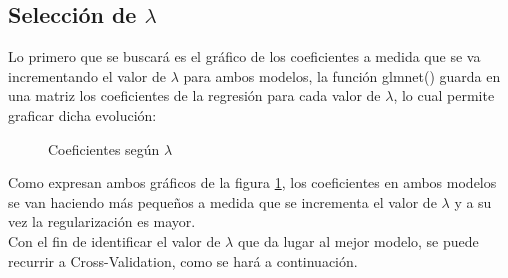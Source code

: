 \subsection{Selección de $\lambda$}


Lo primero que se buscará es el gráfico de los coeficientes a medida que se va incrementando el valor de $\lambda$ para ambos modelos, la función glmnet()\cite{glmnet} guarda en una matriz los coeficientes de la regresión para cada valor de $\lambda$, lo cual permite graficar dicha evolución:



\begin{figure}[h]
\centering
{}%
\hspace{0.25cm}%
\caption{Coeficientes según $\lambda$}
\label{coeficientes}
\end{figure}


Como expresan ambos gráficos de la figura \ref{coeficientes}, los coeficientes en ambos modelos se van haciendo más pequeños a medida que se incrementa el valor de $\lambda$ y a su vez la regularización es mayor.\\

Con el fin de identificar el valor de $\lambda$ que da lugar al mejor modelo, se puede recurrir a Cross-Validation, como se hará a continuación.\\

